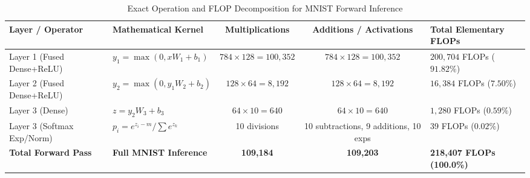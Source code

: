 \documentclass[11pt,a4paper]{article}
\begin{document}
\begin{table}[htbp]
\centering
\small
\caption{Exact Operation and FLOP Decomposition for MNIST Forward Inference}
\label{tab:flop_breakdown}
\begin{tabular}{llccp{5.5cm}}
\toprule
\textbf{Layer / Operator} & \textbf{Mathematical Kernel} & \textbf{Multiplications} & \textbf{Additions / Activations} & \textbf{Total Elementary FLOPs} \\
\midrule
Layer 1 (Fused Dense+ReLU) & $y_1 = \max(0, x W_1 + b_1)$ & $784 \times 128 = 100,352$ & $784 \times 128 = 100,352$ & $200,704$ FLOPs ($91.82\%$) \\
Layer 2 (Fused Dense+ReLU) & $y_2 = \max(0, y_1 W_2 + b_2)$& $128 \times 64 = 8,192$    & $128 \times 64 = 8,192$    & $16,384$ FLOPs ($7.50\%$) \\
Layer 3 (Dense)            & $z = y_2 W_3 + b_3$          & $64 \times 10 = 640$        & $64 \times 10 = 640$        & $1,280$ FLOPs ($0.59\%$) \\
Layer 3 (Softmax Exp/Norm) & $p_i = e^{z_i - m}/\sum e^{z_k}$& 10 divisions               & 10 subtractions, 9 additions, 10 exps & 39 FLOPs ($0.02\%$) \\
\midrule
\textbf{Total Forward Pass}& \textbf{Full MNIST Inference} & \textbf{109,184}           & \textbf{109,203}            & \textbf{218,407 FLOPs (100.0\%)} \\
\bottomrule
\end{tabular}
\end{table}
\end{document}
